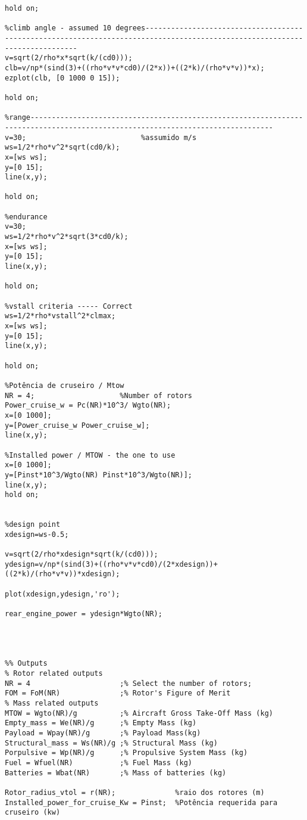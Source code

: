 \begin{verbatim}
hold on;

%climb angle - assumed 10 degrees----------------------------------------------------------------------------------------------------------------------------
v=sqrt(2/rho*x*sqrt(k/(cd0)));
clb=v/np*(sind(3)+((rho*v*v*cd0)/(2*x))+((2*k)/(rho*v*v))*x);
ezplot(clb, [0 1000 0 15]);

hold on;

%range-------------------------------------------------------------------------------------------------------------------------------
v=30;                           %assumido m/s
ws=1/2*rho*v^2*sqrt(cd0/k);
x=[ws ws];
y=[0 15];
line(x,y);

hold on;

%endurance
v=30;
ws=1/2*rho*v^2*sqrt(3*cd0/k);
x=[ws ws];
y=[0 15];
line(x,y);

hold on;

%vstall criteria ----- Correct
ws=1/2*rho*vstall^2*clmax;
x=[ws ws];
y=[0 15];
line(x,y);

hold on;

%Potência de cruseiro / Mtow
NR = 4;                    %Number of rotors
Power_cruise_w = Pc(NR)*10^3/ Wgto(NR);
x=[0 1000];
y=[Power_cruise_w Power_cruise_w];
line(x,y);

%Installed power / MTOW - the one to use
x=[0 1000];
y=[Pinst*10^3/Wgto(NR) Pinst*10^3/Wgto(NR)];
line(x,y);
hold on;


%design point
xdesign=ws-0.5;

v=sqrt(2/rho*xdesign*sqrt(k/(cd0)));
ydesign=v/np*(sind(3)+((rho*v*v*cd0)/(2*xdesign))+((2*k)/(rho*v*v))*xdesign);

plot(xdesign,ydesign,'ro');

rear_engine_power = ydesign*Wgto(NR);




%% Outputs
% Rotor related outputs
NR = 4                     ;% Select the number of rotors;
FOM = FoM(NR)              ;% Rotor's Figure of Merit
% Mass related outputs
MTOW = Wgto(NR)/g          ;% Aircraft Gross Take-Off Mass (kg)
Empty_mass = We(NR)/g      ;% Empty Mass (kg)
Payload = Wpay(NR)/g       ;% Payload Mass(kg)
Structural_mass = Ws(NR)/g ;% Structural Mass (kg)
Porpulsive = Wp(NR)/g      ;% Propulsive System Mass (kg)
Fuel = Wfuel(NR)           ;% Fuel Mass (kg)
Batteries = Wbat(NR)       ;% Mass of batteries (kg)

Rotor_radius_vtol = r(NR);              %raio dos rotores (m)
Installed_power_for_cruise_Kw = Pinst;  %Potência requerida para cruseiro (kw)


\end{verbatim}
